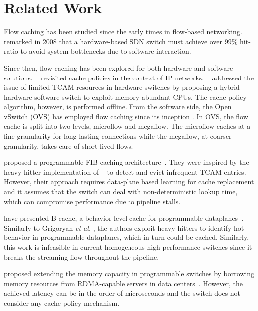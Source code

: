 \section{Related Work}\label{sec:related_works}

Flow caching has been studied since the early times in flow-based networking.
\citeauthor{casado:2008}~\cite{casado:2008} remarked in 2008 that a hardware-based SDN switch must achieve over 99\% hit-ratio to avoid system bottlenecks due to software interaction.

Since then, flow caching has been explored for both hardware and software solutions.
\citeauthor{Kim:09}~\cite{Kim:09} revisited cache policies in the context of IP networks.
\citeauthor{Katta:2014}~\cite{Katta:2014,Katta:2016} addressed the issue of limited TCAM resources in hardware switches by proposing a hybrid hardware-software switch to exploit memory-abundant CPUs.
The cache policy algorithm, however, is performed offline. 
From the software side, the Open vSwitch (OVS) has employed flow caching since its inception \cite{Pfaff:15}.
In OVS, the flow cache is split into two levels, microflow and megaflow.
The microflow caches at a fine granularity for long-lasting connections while the megaflow, at coarser granularity, takes care of short-lived flows.

\citeauthor{Grigoryan:18} proposed a programmable FIB caching architecture~\cite{Grigoryan:18}.
They were inspired by the heavy-hitter implementation of \citeauthor{Sivaraman:17}~\cite{Sivaraman:17} to detect and evict infrequent TCAM entries.
However, their approach requires data-plane based learning for cache replacement and it assumes that the switch can deal with non-deterministic lookup time, which can compromise performance due to pipeline stalls. 

\citeauthor{Zhang:2018} have presented B-cache, a behavior-level cache for programmable dataplanes~\cite{Zhang:2018}. Similarly to Grigoryan \textit{et al.} \cite{Grigoryan:18}, the authors exploit heavy-hitters to identify hot behavior in programmable dataplanes, which in turn could be cached. Similarly, this work is infeasible in current homogeneous high-performance switches since it breaks the streaming flow throughout the pipeline.

\citeauthor{Kim:2018} proposed extending the memory capacity in programmable switches by borrowing memory resources from RDMA-capable servers in data centers~\cite{Kim:2018}. However, the achieved latency can be in the order of microseconds and the switch does not consider any cache policy mechanism.

